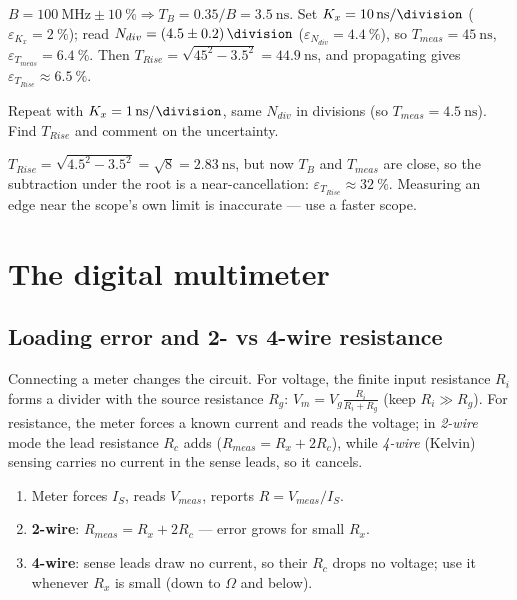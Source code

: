 \documentclass[11pt,a4paper,oneside]{book}
\begin{document}
\begin{wexample}
$B=\qty{100}{\mega\hertz}\pm\qty{10}{\percent}\Rightarrow T_B=0.35/B=\qty{3.5}{\nano\second}$.
Set $K_x=\qty{10}{\nano\second\per\division}$ ($\varepsilon_{K_x}=\qty{2}{\percent}$); read
$N_{div}=(4.5\pm0.2)\,\unit{\division}$ ($\varepsilon_{N_{div}}=\qty{4.4}{\percent}$), so
$T_{meas}=\qty{45}{\nano\second}$, $\varepsilon_{T_{meas}}=\qty{6.4}{\percent}$.
Then $T_{Rise}=\sqrt{45^2-3.5^2}=\qty{44.9}{\nano\second}$, and propagating gives
$\varepsilon_{T_{Rise}}\approx\qty{6.5}{\percent}$.
\end{wexample}

\begin{exercise}
Repeat with $K_x=\qty{1}{\nano\second\per\division}$, same $N_{div}$ in divisions
(so $T_{meas}=\qty{4.5}{\nano\second}$). Find $T_{Rise}$ and comment on the
uncertainty.
\end{exercise}
\begin{solution}
$T_{Rise}=\sqrt{4.5^2-3.5^2}=\sqrt{8}=\qty{2.83}{\nano\second}$, but now $T_B$ and
$T_{meas}$ are close, so the subtraction under the root is a near-cancellation:
$\varepsilon_{T_{Rise}}\approx\qty{32}{\percent}$. Measuring an edge near the
scope's own limit is inaccurate --- use a faster scope.
\end{solution}

\chapter{The digital multimeter}\label{ch:dmm}

\section{Loading error and 2- vs 4-wire resistance}
Connecting a meter changes the circuit. For voltage, the finite input resistance
$R_i$ forms a divider with the source resistance $R_g$:
$V_m=V_g\frac{R_i}{R_i+R_g}$ (keep $R_i\gg R_g$). For resistance, the meter forces
a known current and reads the voltage; in \emph{2-wire} mode the lead resistance
$R_c$ adds ($R_{meas}=R_x+2R_c$), while \emph{4-wire} (Kelvin) sensing carries no
current in the sense leads, so it cancels.

\begin{protocol}
\begin{enumerate}[leftmargin=1.5cm]
  \item Meter forces $I_S$, reads $V_{meas}$, reports $R=V_{meas}/I_S$.
  \item \textbf{2-wire}: $R_{meas}=R_x+2R_c$ --- error grows for small $R_x$.
  \item \textbf{4-wire}: sense leads draw no current, so their $R_c$ drops no
        voltage; use it whenever $R_x$ is small (down to $\Omega$ and below).
\end{enumerate}
\end{protocol}
\end{document}
